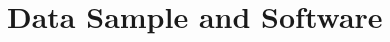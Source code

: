 \documentclass[../AnalysisNoteJBuxton.tex]{subfiles}
\begin{document}
\section{Data Sample and Software}
\label{sec:DataSampleAndSoftware}



\end{document}
